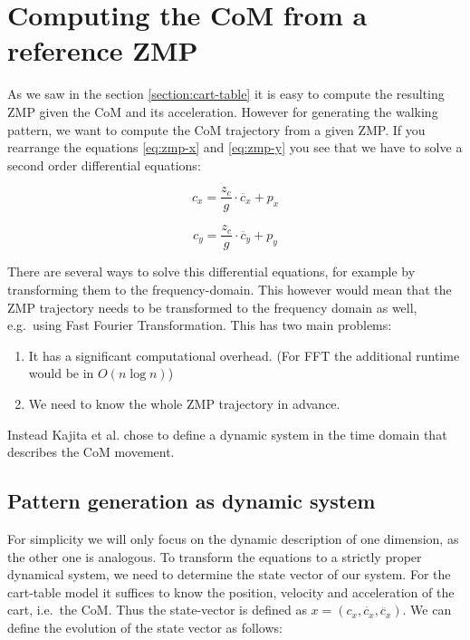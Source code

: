 \documentclass[english,ngerman]{KITreprt}
\begin{document}
\section{Computing the CoM from a reference
ZMP}\label{computing-the-com-from-a-reference-zmp}

As we saw in the section \ref{section:cart-table} it is easy to compute
the resulting ZMP given the CoM and its acceleration. However for
generating the walking pattern, we want to compute the CoM trajectory
from a given ZMP. If you rearrange the equations \ref{eq:zmp-x} and
\ref{eq:zmp-y} you see that we have to solve a second order differential
equations:

\begin{equation} \label{eq:com-x}
c_x = \frac{z_c}{g} \cdot \ddot{c_x} + p_x
\end{equation}

\begin{equation} \label{eq:com-y}
c_y = \frac{z_c}{g} \cdot \ddot{c_y} + p_y
\end{equation}

There are several ways to solve this differential equations, for example
by transforming them to the frequency-domain. This however would mean
that the ZMP trajectory needs to be transformed to the frequency domain
as well, e.g.~using Fast Fourier Transformation. This has two main
problems:

\begin{enumerate}
\def\labelenumi{\arabic{enumi}.}
\item
  It has a significant computational overhead. (For FFT the additional
  runtime would be in $O(n \log n)$)
\item
  We need to know the whole ZMP trajectory in advance.
\end{enumerate}

Instead Kajita et al. chose to define a dynamic system in the time
domain that describes the CoM movement.

\subsection{Pattern generation as dynamic
system}\label{pattern-generation-as-dynamic-system}

For simplicity we will only focus on the dynamic description of one
dimension, as the other one is analogous. To transform the equations to
a strictly proper dynamical system, we need to determine the state
vector of our system. For the cart-table model it suffices to know the
position, velocity and acceleration of the cart, i.e.~the CoM. Thus the
state-vector is defined as $x = (c_x, \dot{c_x}, \ddot{c_x})$. We can
define the evolution of the state vector as follows:
\end{document}
